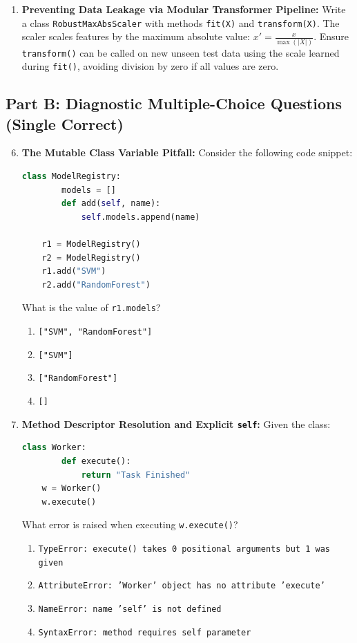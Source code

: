 \begin{enumerate}
    \item \textbf{Preventing Data Leakage via Modular Transformer Pipeline:}
    Write a class \texttt{RobustMaxAbsScaler} with methods \texttt{fit(X)} and \texttt{transform(X)}.
    The scaler scales features by the maximum absolute value: $x' = \frac{x}{\max(|X|)}$.
    Ensure \texttt{transform()} can be called on new unseen test data using the scale learned during \texttt{fit()}, avoiding division by zero if all values are zero.
\end{enumerate}

\subsection*{Part B: Diagnostic Multiple-Choice Questions (Single Correct)}

\begin{enumerate}
    \setcounter{enumi}{5}
    \item \textbf{The Mutable Class Variable Pitfall:}
    Consider the following code snippet:
    \begin{lstlisting}[language=Python]
    class ModelRegistry:
        models = []
        def add(self, name):
            self.models.append(name)

    r1 = ModelRegistry()
    r2 = ModelRegistry()
    r1.add("SVM")
    r2.add("RandomForest")
    \end{lstlisting}
    What is the value of \texttt{r1.models}?
    \begin{enumerate}
        \item \texttt{["SVM", "RandomForest"]}
        \item \texttt{["SVM"]}
        \item \texttt{["RandomForest"]}
        \item \texttt{[]}
    \end{enumerate}

    \item \textbf{Method Descriptor Resolution and Explicit \texttt{self}:}
    Given the class:
    \begin{lstlisting}[language=Python]
    class Worker:
        def execute():
            return "Task Finished"
    w = Worker()
    w.execute()
    \end{lstlisting}
    What error is raised when executing \texttt{w.execute()}?
    \begin{enumerate}
        \item \texttt{TypeError: execute() takes 0 positional arguments but 1 was given}
        \item \texttt{AttributeError: 'Worker' object has no attribute 'execute'}
        \item \texttt{NameError: name 'self' is not defined}
        \item \texttt{SyntaxError: method requires self parameter}
    \end{enumerate}
\end{enumerate}
